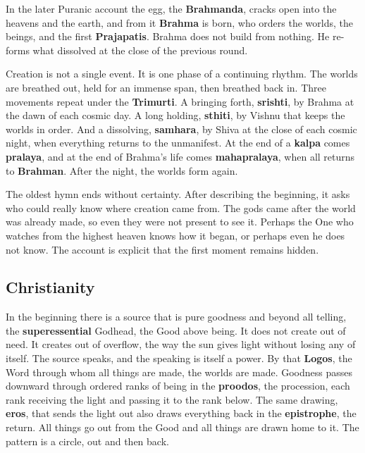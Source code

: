 In the later Puranic account the egg, the \textbf{Brahmanda}, cracks open into the heavens and the earth, and from it \textbf{Brahma} is born, who orders the worlds, the beings, and the first \textbf{Prajapatis}. Brahma does not build from nothing. He re-forms what dissolved at the close of the previous round.

Creation is not a single event. It is one phase of a continuing rhythm. The worlds are breathed out, held for an immense span, then breathed back in. Three movements repeat under the \textbf{Trimurti}. A bringing forth, \textbf{srishti}, by Brahma at the dawn of each cosmic day. A long holding, \textbf{sthiti}, by Vishnu that keeps the worlds in order. And a dissolving, \textbf{samhara}, by Shiva at the close of each cosmic night, when everything returns to the unmanifest. At the end of a \textbf{kalpa} comes \textbf{pralaya}, and at the end of Brahma's life comes \textbf{mahapralaya}, when all returns to \textbf{Brahman}. After the night, the worlds form again.

The oldest hymn ends without certainty. After describing the beginning, it asks who could really know where creation came from. The gods came after the world was already made, so even they were not present to see it. Perhaps the One who watches from the highest heaven knows how it began, or perhaps even he does not know. The account is explicit that the first moment remains hidden.

\subsection{Christianity}

In the beginning there is a source that is pure goodness and beyond all telling, the \textbf{superessential} Godhead, the Good above being. It does not create out of need. It creates out of overflow, the way the sun gives light without losing any of itself. The source speaks, and the speaking is itself a power. By that \textbf{Logos}, the Word through whom all things are made, the worlds are made. Goodness passes downward through ordered ranks of being in the \textbf{proodos}, the procession, each rank receiving the light and passing it to the rank below. The same drawing, \textbf{eros}, that sends the light out also draws everything back in the \textbf{epistrophe}, the return. All things go out from the Good and all things are drawn home to it. The pattern is a circle, out and then back.

